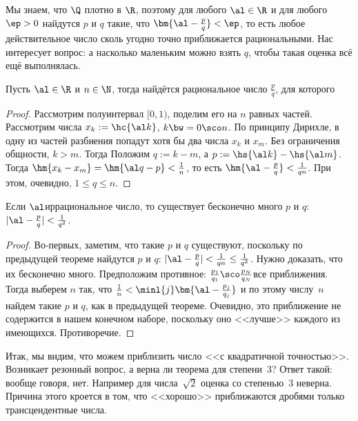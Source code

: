 \documentclass[a4paper]{article}
\begin{document}
Мы знаем, что $\Q$ плотно в $\R$, поэтому для любого $\al\in\R$ и для любого $\ep>0$
найдутся $p$ и $q$ такие, что ${\bm{\al-\frac{p}q}<\ep}$, то есть любое действительное число сколь угодно
точно приближается рациональными. Нас интересует вопрос: а насколько маленьким
можно взять $q$, чтобы такая оценка всё ещё выполнялась.

\begin{theorem}[Дирихле]
Пусть $\al\in\R$ и $n\in\N$, тогда найдётся рациональное число $\frac{p}q$, для которого
\end{theorem}
\begin{proof}
Рассмотрим полуинтервал $[0,1)$, поделим его на $n$ равных частей.
Рассмотрим числа $x_k := \hc{\al k}$, $k \bw= 0\sco n$. По принципу Дирихле,
в одну из частей разбиения попадут хотя бы два числа $x_k$ и $x_m$.
Без ограничения общности, $k > m$. Тогда
Положим $q := k - m$, а $p := \hs{\al k} - \hs{\al m}$. Тогда
$\hm{x_k - x_m} = \hm{\al q - p} < \frac1n$, то есть $\hm{\al - \frac pq} < \frac1{qn}$.
При этом, очевидно, $1 \le q \le n$.
\end{proof}

\begin{imp}
Если $\al$\т  иррациональное число, то существует бесконечно много $p$ и $q$:
$|\al-\frac{p}q|<\frac1{q^2}$.
\end{imp}
\begin{proof}
Во-первых, заметим, что такие $p$ и $q$ существуют, поскольку по предыдущей теореме найдутся $p$ и $q$:
${|\al-\frac{p}q|<\frac1{qn}\le\frac1{q^2}}$. Нужно доказать, что их бесконечно много. Предположим
противное: $\frac{p_1}{q_1}\sco \frac{p_N}{q_N}$\т все приближения. Тогда выберем $n$ так,
что $\frac1n<\minl{j}\bm{\al-\frac{p_j}{q_j}}$ и по этому числу~$n$
найдем такие $p$ и $q$, как в предыдущей теореме. Очевидно, это приближение не содержится в нашем конечном
наборе, поскольку оно <<лучше>> каждого из имеющихся. Противоречие.
\end{proof}

Итак, мы видим, что можем приблизить число <<с квадратичной точностью>>. Возникает резонный вопрос,
а верна ли теорема для степени~3?  Ответ такой: вообще говоря, нет.
Например для числа~$\sqrt{2}$ оценка со степенью~3 неверна. Причина этого кроется в том, что <<хорошо>> приближаются дробями
только трансцендентные числа.
\end{document}
